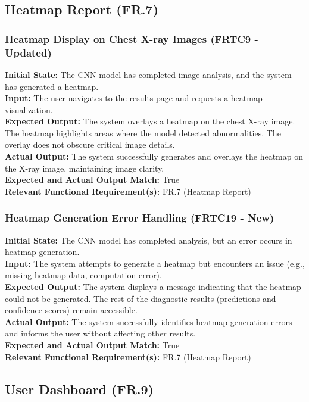 \documentclass[12pt, titlepage]{article}
\begin{document}
\subsection{Heatmap Report (FR.7)}
\subsubsection{Heatmap Display on Chest X-ray Images (FRTC9 - Updated)}
\textbf{Initial State:} The CNN model has completed image analysis, and the system has generated a heatmap.\\
\textbf{Input:} The user navigates to the results page and requests a heatmap visualization.\\
\textbf{Expected Output:} The system overlays a heatmap on the chest X-ray image. The heatmap highlights areas where the model detected abnormalities. The overlay does not obscure critical image details.\\
\textbf{Actual Output:} The system successfully generates and overlays the heatmap on the X-ray image, maintaining image clarity.\\
\textbf{Expected and Actual Output Match:} True\\
\textbf{Relevant Functional Requirement(s):} FR.7 (Heatmap Report)\\

\subsubsection{Heatmap Generation Error Handling (FRTC19 - New)}
\textbf{Initial State:} The CNN model has completed analysis, but an error occurs in heatmap generation.\\
\textbf{Input:} The system attempts to generate a heatmap but encounters an issue (e.g., missing heatmap data, computation error).\\
\textbf{Expected Output:} The system displays a message indicating that the heatmap could not be generated. The rest of the diagnostic results (predictions and confidence scores) remain accessible.\\
\textbf{Actual Output:} The system successfully identifies heatmap generation errors and informs the user without affecting other results.\\
\textbf{Expected and Actual Output Match:} True\\
\textbf{Relevant Functional Requirement(s):} FR.7 (Heatmap Report)\\

\subsection{User Dashboard (FR.9)}
\end{document}
